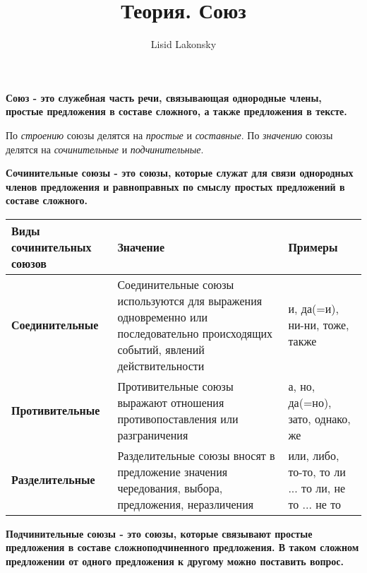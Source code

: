 \documentclass[11pt]{article} %
\title{Теория. Союз}
\author{Lisid Lakonsky}
\begin{document}
\maketitle

\textbf{Союз - это служебная часть речи, связывающая однородные члены, простые предложения в составе сложного, а также предложения в тексте.}


По \emph{строению} союзы делятся на \emph{простые} и \emph{составные}. По \emph{значению} союзы делятся на \emph{сочинительные} и \emph{подчинительные}.


\textbf{Сочинительные союзы - это союзы, которые служат для связи однородных членов предложения и равноправных по смыслу простых предложений в составе сложного.}

\vspace{5mm}

\begin{tabular}{ | p{100pt} | p{100pt} | p{200pt} | }
\hline
\textbf{Виды сочинительных союзов} & \textbf{Значение} & \textbf{Примеры} \\ \hline
\textbf{Соединительные} & Соединительные союзы используются для выражения одновременно или последовательно происходящих событий, явлений действительности & и, да(=и), ни-ни, тоже, также \\ \hline
\textbf{Противительные} & Противительные союзы выражают отношения противопоставления или разграничения & а, но, да(=но), зато, однако, же \\ \hline
\textbf{Разделительные} & Разделительные союзы вносят в предложение значения чередования, выбора, предложения, неразличения & или, либо, то-то, то ли ... то ли, не то ... не то \\
\hline
\end{tabular}

\vspace{5mm}

\textbf{Подчинительные союзы - это союзы, которые связывают простые предложения в составе сложноподчиненного предложения. В таком сложном предложении от одного предложения к другому можно поставить вопрос.}
\end{document}
